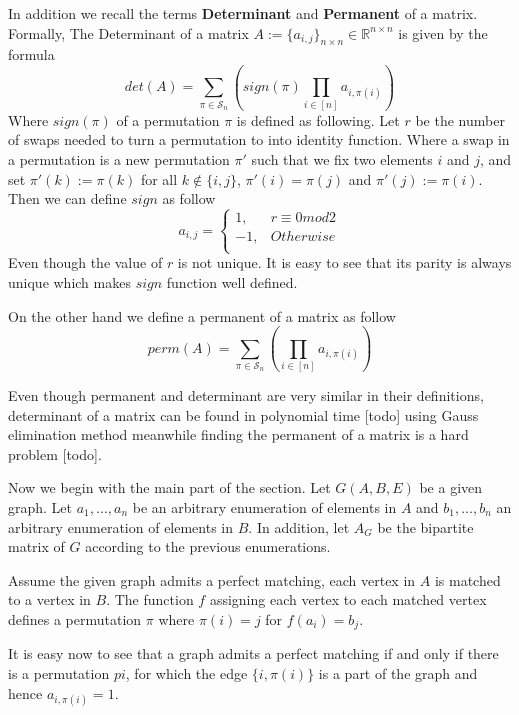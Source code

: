 In addition we recall the terms \textbf{Determinant} and \textbf{Permanent} of a matrix.
Formally, The Determinant of a matrix $A := \{a_{i, j}\}_{n \times n} \in \mathbb{R}^{n \times n}$ is given by the formula
\[
	det(A) = \sum\limits_{\pi \in \mathcal{S}_n} \left( sign(\pi) \prod\limits_{i \in [n]} a_{i, \pi(i)}  \right)
\]
Where $sign(\pi)$ of a permutation $\pi$ is defined as following.
Let $r$ be the number of swaps needed to turn a permutation to into identity function. Where a swap in a permutation is a new permutation $\pi'$ such that we fix two elements $i$ and $j$, and set $\pi'(k) := \pi(k)$ for all $k \notin \{i, j\}$, $\pi'(i) = \pi(j)$ and $\pi'(j) := \pi(i)$.
Then we can define $sign$ as follow
	\begin{equation*}
		a_{i,j} =
		\begin{cases}
			1, & r \equiv 0 mod 2\\
			-1, & Otherwise\\
		\end{cases}
	\end{equation*}
Even though the value of $r$ is not unique. It is easy to see that its parity is always unique which makes $sign$ function well defined.

On the other hand we define a permanent of a matrix as follow
\[
	perm(A) = \sum\limits_{\pi \in \mathcal{S}_n} \left( \prod\limits_{i \in [n]} a_{i, \pi(i)}  \right)
\]

Even though permanent and determinant are very similar in their definitions, determinant of a matrix can be found in polynomial time [todo] using Gauss elimination method meanwhile finding the permanent of a matrix is a hard problem [todo].

Now we begin with the main part of the section. Let $G(A, B, E)$ be a given graph. Let $a_1, \dots, a_n$ be an arbitrary enumeration of elements in $A$ and $b_1, \dots, b_n$ an arbitrary enumeration of elements in $B$. In addition, let $A_G$ be the bipartite matrix of $G$ according to the previous enumerations. 

Assume the given graph admits a perfect matching, each vertex in $A$ is matched to a vertex in $B$. The function $f$ assigning each vertex to each matched vertex defines a permutation $\pi$ where $\pi(i) = j$ for $f(a_i) = b_j$.

It is easy now to see that a graph admits a perfect matching if and only if there is a permutation $pi$, for which the edge $\{i, \pi(i)\}$ is a part of the graph and hence $a_{i, \pi(i)} = 1$.

